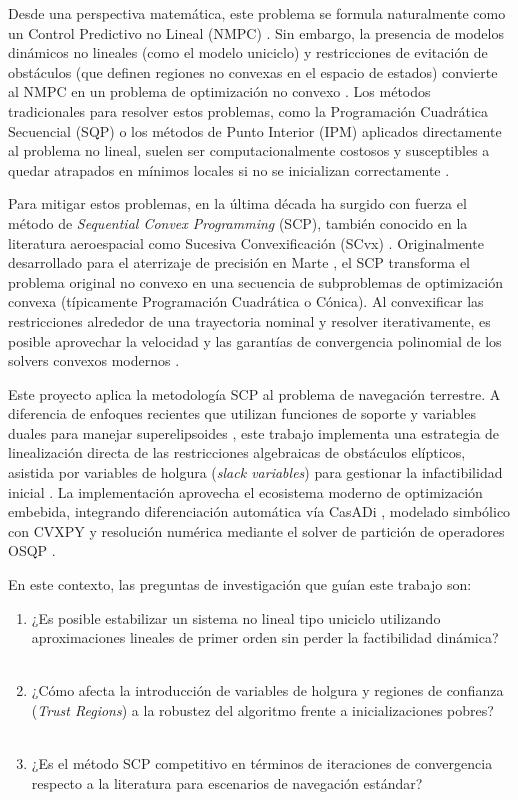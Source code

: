 \documentclass[conference]{IEEEtran}
\begin{document}
Desde una perspectiva matemática, este problema se formula naturalmente como un Control Predictivo no Lineal (NMPC) \cite{grune_nmpc}. Sin embargo, la presencia de modelos dinámicos no lineales (como el modelo uniciclo) y restricciones de evitación de obstáculos (que definen regiones no convexas en el espacio de estados) convierte al NMPC en un problema de optimización no convexo \cite{boyd_convex}. Los métodos tradicionales para resolver estos problemas, como la Programación Cuadrática Secuencial (SQP) o los métodos de Punto Interior (IPM) aplicados directamente al problema no lineal, suelen ser computacionalmente costosos y susceptibles a quedar atrapados en mínimos locales si no se inicializan correctamente \cite{diehl_nmpc}.

Para mitigar estos problemas, en la última década ha surgido con fuerza el método de \textit{Sequential Convex Programming} (SCP), también conocido en la literatura aeroespacial como Sucesiva Convexificación (SCvx) \cite{scvx_mao}. Originalmente desarrollado para el aterrizaje de precisión en Marte \cite{szmuk_landing, scvx_survey}, el SCP transforma el problema original no convexo en una secuencia de subproblemas de optimización convexa (típicamente Programación Cuadrática o Cónica). Al convexificar las restricciones alrededor de una trayectoria nominal y resolver iterativamente, es posible aprovechar la velocidad y las garantías de convergencia polinomial de los solvers convexos modernos \cite{boyd_convex}.

Este proyecto aplica la metodología SCP al problema de navegación terrestre. A diferencia de enfoques recientes que utilizan funciones de soporte y variables duales para manejar superelipsoides \cite{moran_nmpc}, este trabajo implementa una estrategia de linealización directa de las restricciones algebraicas de obstáculos elípticos, asistida por variables de holgura (\textit{slack variables}) para gestionar la infactibilidad inicial \cite{scvx_mao}. La implementación aprovecha el ecosistema moderno de optimización embebida, integrando diferenciación automática vía CasADi \cite{casadi}, modelado simbólico con CVXPY \cite{cvxpy} y resolución numérica mediante el solver de partición de operadores OSQP \cite{osqp}.

En este contexto, las preguntas de investigación que guían este trabajo son:
\begin{enumerate}
    \item ¿Es posible estabilizar un sistema no lineal tipo uniciclo utilizando aproximaciones lineales de primer orden sin perder la factibilidad dinámica?
    \item ¿Cómo afecta la introducción de variables de holgura y regiones de confianza (\textit{Trust Regions}) a la robustez del algoritmo frente a inicializaciones pobres?
    \item ¿Es el método SCP competitivo en términos de iteraciones de convergencia respecto a la literatura para escenarios de navegación estándar?
\end{enumerate}
\end{document}
